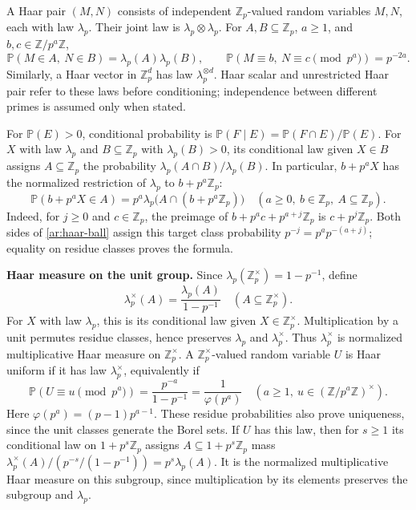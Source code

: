 \documentclass[twoside]{aomart}
\theoremstyle{paperplain}
\theoremstyle{paperdefinition}
\newcommand{\Z}{\mathbb Z}
\newcommand{\Pp}{\mathbb P}
\numberwithin{equation}{section}
\begin{document}
A Haar pair $(M,N)$ consists of independent $\Z_p$-valued
random variables $M,N$, each with law $\lambda_p$.
Their joint law is $\lambda_p\otimes\lambda_p$.
For $A,B\subseteq\Z_p$, $a\ge1$, and $b,c\in\Z/p^a\Z$,
\begin{equation*}
 \Pp(M\in A,\ N\in B)=\lambda_p(A)\lambda_p(B),\qquad
 \Pp(M\equiv b,\ N\equiv c\pmod{p^a})=p^{-2a}.
\end{equation*}
Similarly, a Haar vector in $\Z_p^d$ has law
$\lambda_p^{\otimes d}$. Haar scalar and unrestricted Haar
pair refer to these laws before conditioning; independence
between different primes is assumed only when stated.

For $\Pp(E)>0$, conditional probability is
$\Pp(F\mid E)=\Pp(F\cap E)/\Pp(E)$.
For $X$ with law $\lambda_p$ and $B\subseteq\Z_p$ with
$\lambda_p(B)>0$, its conditional law given $X\in B$
assigns $A\subseteq\Z_p$ the probability
$\lambda_p(A\cap B)/\lambda_p(B)$.
In particular, $b+p^aX$ has the normalized restriction
of $\lambda_p$ to $b+p^a\Z_p$:
\begin{equation}
 \Pp(b+p^aX\in A)
   =p^a\lambda_p\bigl(A\cap(b+p^a\Z_p)\bigr)
 \quad(a\ge0,\ b\in\Z_p,\ A\subseteq\Z_p).
 \label{ar:haar-ball}
\end{equation}
Indeed, for $j\ge0$ and $c\in\Z_p$, the preimage of
$b+p^ac+p^{a+j}\Z_p$ is $c+p^j\Z_p$.
Both sides of \eqref{ar:haar-ball} assign this target
class probability $p^{-j}=p^ap^{-(a+j)}$; equality on
residue classes proves the formula.

\par\smallskip\noindent\textbf{Haar measure on the unit group.}
Since $\lambda_p(\Z_p^\times)=1-p^{-1}$, define
\begin{equation}
 \lambda_p^\times(A)
   =\frac{\lambda_p(A)}{1-p^{-1}}
 \quad(A\subseteq\Z_p^\times).
 \label{ar:haar-unit-measure}
\end{equation}
For $X$ with law $\lambda_p$, this is its conditional
law given $X\in\Z_p^\times$. Multiplication by a unit
permutes residue classes, hence preserves $\lambda_p$
and $\lambda_p^\times$. Thus $\lambda_p^\times$ is
normalized multiplicative Haar measure on $\Z_p^\times$.
A $\Z_p^\times$-valued random variable $U$ is Haar uniform
if it has law $\lambda_p^\times$, equivalently if
\begin{equation*}
 \Pp(U\equiv u\pmod{p^a})
   =\frac{p^{-a}}{1-p^{-1}}
   =\frac1{\varphi(p^a)}
 \quad(a\ge1,\ u\in(\Z/p^a\Z)^\times).
\end{equation*}
Here $\varphi(p^a)=(p-1)p^{a-1}$. These residue probabilities
also prove uniqueness, since the unit classes generate
the Borel sets. If $U$ has this law, then for $s\ge1$
its conditional law
on $1+p^s\Z_p$ assigns $A\subseteq1+p^s\Z_p$ mass
$\lambda_p^\times(A)/(p^{-s}/(1-p^{-1}))=p^s\lambda_p(A)$.
It is the normalized multiplicative Haar measure on this
subgroup, since multiplication by its elements preserves
the subgroup and $\lambda_p$.
\end{document}
